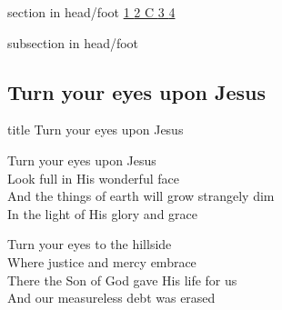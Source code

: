 \documentclass[aspectratio=169]{beamer}
\begin{document}
{
{ 
 {
 \begin{beamercolorbox}[ht=4.5ex,dp=1.5ex,%
      leftskip=.3cm,rightskip=.3cm plus1fil]{section in head/foot}
 \fontsize{12}{25}\selectfont 
\hyperlink{Turn your eyes upon Jesus[]1}{1  }\hyperlink{Turn your eyes upon Jesus[]2}{2  }\hyperlink{Turn your eyes upon Jesus[]C}{C  }\hyperlink{Turn your eyes upon Jesus[]3}{3  }\hyperlink{Turn your eyes upon Jesus[]4}{4  } 
 \end{beamercolorbox}%
  \begin{beamercolorbox}[ht=2.5ex,dp=1.125ex,%
   leftskip=.3cm,rightskip=.3cm plus1fil]{subsection in head/foot}
   \insertauthor
 \end{beamercolorbox}%
 }
}
\subsection{Turn your eyes upon Jesus}
\hypertarget{Turn your eyes upon Jesus[]}{}
\begin{frame}{}
 \vfill
  \centering
  \begin{beamercolorbox}[sep=8pt,center,shadow=true,rounded=true]{title}
    Turn your eyes upon Jesus     
  \end{beamercolorbox}
  \vfill
\end{frame}

\hypertarget{Turn your eyes upon Jesus[]1}{}
\begin{frame}{}
\fontsize{19.148936170212767}{22.97872340425532}\selectfont

Turn your eyes upon Jesus\\ 
Look full in His wonderful face\\ 
And the things of earth will grow strangely dim\\ 
In the light of His glory and grace

\end{frame}
\hypertarget{Turn your eyes upon Jesus[]2}{}
\begin{frame}{}
\fontsize{19.148936170212767}{22.97872340425532}\selectfont

Turn your eyes to the hillside\\ 
Where justice and mercy embrace\\ 
There the Son of God gave His life for us\\ 
And our measureless debt was erased


\end{frame}}
\end{document}
